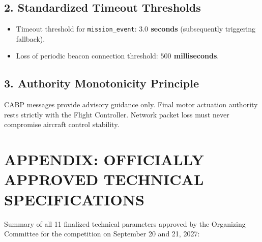 \documentclass[12pt,a4paper]{article}
\begin{document}
\subsection*{2. Standardized Timeout Thresholds}
\begin{itemize}
\item Timeout threshold for \texttt{mission\_event}: \textbf{$3.0$ seconds} (subsequently triggering fallback).
\item Loss of periodic beacon connection threshold: \textbf{$500$ milliseconds}.
\end{itemize}

\subsection*{3. Authority Monotonicity Principle}
CABP messages provide advisory guidance only. Final motor actuation authority rests strictly with the Flight Controller. Network packet loss must never compromise aircraft control stability.

\section{APPENDIX: OFFICIALLY APPROVED TECHNICAL SPECIFICATIONS}

Summary of all 11 finalized technical parameters approved by the Organizing Committee for the competition on September 20 and 21, 2027:
\end{document}
